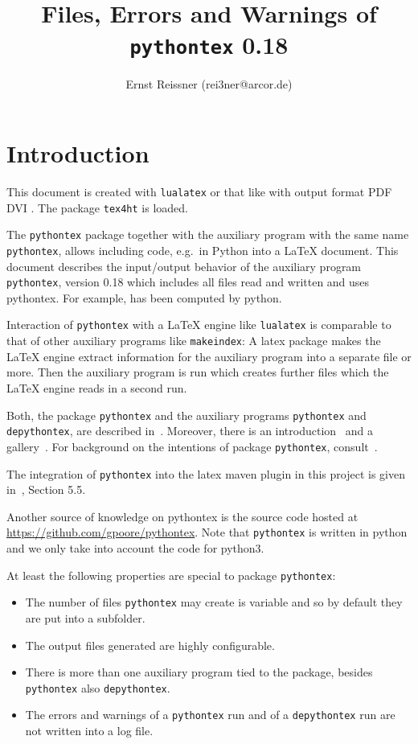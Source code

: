 \documentclass[a4paper, english]{article}%
\title{Files, Errors and Warnings of \texttt{pythontex} 0.18 }
\author{Ernst Reissner (rei3ner@arcor.de)}
\date{\Today}
\newcommand{\lualatex}{\texttt{lualatex}}
\newcommand{\makeIndex}{\texttt{makeindex}}
\newcommand{\pytex}{\texttt{pythontex}}
\newcommand{\Ppytex}{package \texttt{pythontex}}
\newcommand{\pytexP}{\texttt{pythontex} package}
\newcommand{\dpytex}{\texttt{depythontex}}
\begin{document}
\maketitle
\tableofcontents
\listoffigures
\listoftables
\lstlistoflistings%

\section{Introduction}

This document is created with \lualatex{} or that like 
with output format 
\ifpdf%
PDF%
\else
DVI%
\fi.
The package \texttt{tex4ht} 
is  loaded. 

The \pytexP{} together with the auxiliary program with the same name \pytex{}, 
allows including code, e.g.~in Python into a \LaTeX{} document. 
This document describes the input/output behavior of the auxiliary program \pytex{}, version 0.18
which includes all files read and written and uses pythontex. 
For example, \texttt{} has been computed by python. 

Interaction of \pytex{} with a \LaTeX{} engine like \lualatex{} 
is comparable to that of other auxiliary programs like \makeIndex: 
A latex package makes the \LaTeX{} engine extract information for the auxiliary program 
into a separate file or more. 
Then the auxiliary program is run which creates further files 
which the \LaTeX{} engine reads in a second run. 

Both, the package \texttt{pythontex} and the auxiliary programs \pytex{} and \dpytex{}, 
are described in~\cite{PythonTexP}. 
Moreover, there is an introduction~\cite{PythonTexQ} and a gallery~\cite{PythonTexG}. 
For background on the intentions of package \texttt{pythontex}, consult~\cite{PythonTexRepr}. 

The integration of \texttt{pythontex} into the latex maven plugin in this project 
is given in~\cite{LatexPlugin}, Section 5.5. 

Another source of knowledge on pythontex is the source code hosted at 
\url{https://github.com/gpoore/pythontex}. 
Note that \texttt{pythontex} is written in python and we only take into account the code for python3. 

At least the following properties are special to \Ppytex: 
%
\begin{itemize}
  \item The number of files \pytex{} may create is variable 
  and so by default they are put into a subfolder. 
  \item The output files generated are highly configurable. 
  \item There is more than one auxiliary program tied to the package, besides \pytex{} also \dpytex{}. 
  \item The errors and warnings of a \pytex{} run and of a \dpytex{} run are not written into a log file. 
\end{itemize}
\end{document}
